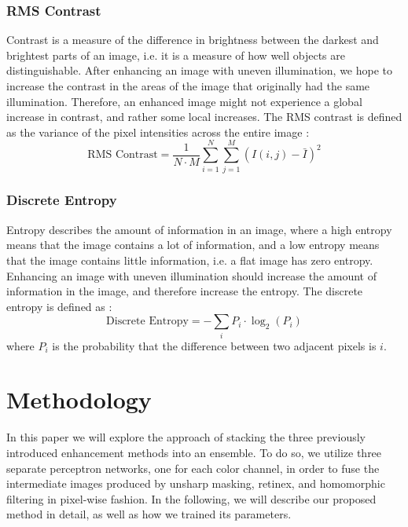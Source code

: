 \documentclass[sigconf]{acmart}
\begin{document}
\subsubsection{RMS Contrast}\label{sec:rms-contrast}
Contrast is a measure of the difference in brightness between the darkest and brightest parts of an image, i.e. it is a measure of how well objects are distinguishable. After enhancing an image with uneven illumination, we hope to increase the contrast in the areas of the image that originally had the same illumination. Therefore, an enhanced image might not experience a global increase in contrast, and rather some local increases. The RMS contrast is defined as the variance of the pixel intensities across the entire image \cite{dey2019uneven}:
\begin{equation}
	\text{RMS Contrast} = \frac{1}{N \cdot M} \sum_{i=1}^{N} \sum_{j=1}^{M} (I(i,j) - \bar{I})^2
\end{equation}

\subsubsection{Discrete Entropy}\label{sec:discrete-entropy}
Entropy describes the amount of information in an image, where a high entropy means that the image contains a lot of information, and a low entropy means that the image contains little information, i.e. a flat image has zero entropy. Enhancing an image with uneven illumination should increase the amount of information in the image, and therefore increase the entropy. The discrete entropy is defined as \cite{dey2019uneven,ye2007discrete}:
\begin{equation}
	\text{Discrete Entropy} = - \sum_{i} P_i \cdot \log_2(P_i)
\end{equation}
where $P_i$ is the probability that the difference between two adjacent pixels is $i$.


\section{Methodology}\label{sec:method}
In this paper we will explore the approach of stacking the three previously introduced enhancement methods into an ensemble. To do so, we utilize three separate perceptron networks, one for each color channel, in order to fuse the intermediate images produced by unsharp masking, retinex, and homomorphic filtering in pixel-wise fashion. In the following, we will describe our proposed method in detail, as well as how we trained its parameters.
\end{document}
